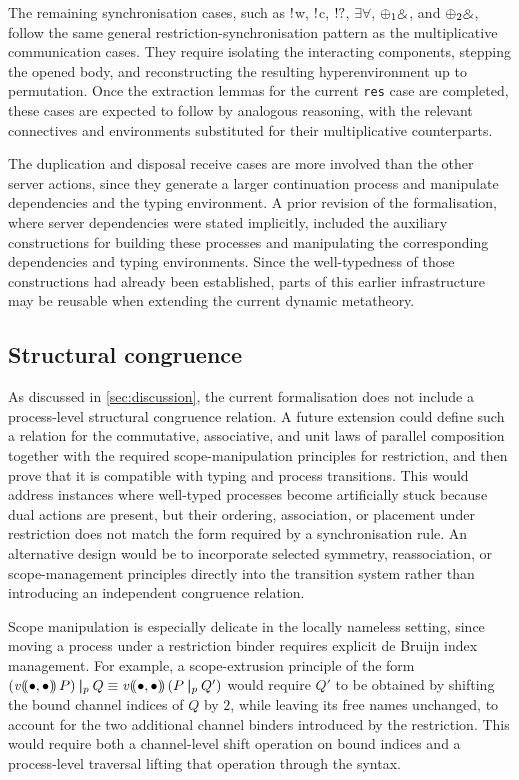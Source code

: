The remaining synchronisation cases, such as $\mathord{!}$w, $\mathord{!}$c, $\mathord{!}\mathord{?}$, $\exists\forall$, $\oplus_1\mathbin{\binampersand}$, and $\oplus_2\mathbin{\binampersand}$, follow the same general restriction-synchronisation pattern as the multiplicative communication cases. They require isolating the interacting components, stepping the opened body, and reconstructing the resulting hyperenvironment up to permutation. Once the extraction lemmas for the current \texttt{res} case are completed, these cases are expected to follow by analogous reasoning, with the relevant connectives and environments substituted for their multiplicative counterparts.

The duplication and disposal receive cases are more involved than the other server actions, since they generate a larger continuation process and manipulate dependencies and the typing environment. A prior revision of the formalisation, where server dependencies were stated implicitly, included the auxiliary constructions for building these processes and manipulating the corresponding dependencies and typing environments. Since the well-typedness of those constructions had already been established, parts of this earlier infrastructure may be reusable when extending the current dynamic metatheory.

\subsection{Structural congruence}
As discussed in \cref{sec:discussion}, the current formalisation does not include a process-level structural congruence relation. A future extension could define such a relation for the commutative, associative, and unit laws of parallel composition together with the required scope-manipulation principles for restriction, and then prove that it is compatible with typing and process transitions. This would address instances where well-typed processes become artificially stuck because dual actions are present, but their ordering, association, or placement under restriction does not match the form required by a synchronisation rule. An alternative design would be to incorporate selected symmetry, reassociation, or scope-management principles directly into the transition system rather than introducing an independent congruence relation.

Scope manipulation is especially delicate in the locally nameless setting, since moving a process under a restriction binder requires explicit de Bruijn index management. For example, a scope-extrusion principle of the form $(\mathit{v}\lparen\mkern-4mu\lparen\bullet,\bullet\rparen\mkern-4mu\rparen\, P) \mathbin{\boldsymbol{|}}_p Q \equiv \mathit{v}\lparen\mkern-4mu\lparen\bullet,\bullet\rparen\mkern-4mu\rparen\, (P \mathbin{\boldsymbol{|}}_p Q')$ would require $Q'$ to be obtained by shifting the bound channel indices of $Q$ by $2$, while leaving its free names unchanged, to account for the two additional channel binders introduced by the restriction. This would require both a channel-level shift operation on bound indices and a process-level traversal lifting that operation through the syntax.

